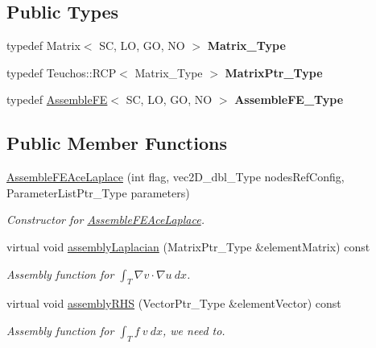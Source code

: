 \subsection*{Public Types}
\begin{DoxyCompactItemize}
\item 
\mbox{\label{classFEDD_1_1AssembleFEAceLaplace_ad5a1d233cdc46488449047924e868010}} 
typedef Matrix$<$ SC, LO, GO, NO $>$ {\bfseries Matrix\+\_\+\+Type}
\item 
\mbox{\label{classFEDD_1_1AssembleFEAceLaplace_aef601b47321c72006e231340b6b79f01}} 
typedef Teuchos\+::\+R\+CP$<$ Matrix\+\_\+\+Type $>$ {\bfseries Matrix\+Ptr\+\_\+\+Type}
\item 
\mbox{\label{classFEDD_1_1AssembleFEAceLaplace_aa8feabd583240a7d1dc1f826ac01bdff}} 
typedef \hyperlink{classFEDD_1_1AssembleFE}{Assemble\+FE}$<$ SC, LO, GO, NO $>$ {\bfseries Assemble\+F\+E\+\_\+\+Type}
\end{DoxyCompactItemize}
\subsection*{Public Member Functions}
\begin{DoxyCompactItemize}
\item 
\hyperlink{classFEDD_1_1AssembleFEAceLaplace_a3e81060bb08ca1a1b9764e432eeed762}{Assemble\+F\+E\+Ace\+Laplace} (int flag, vec2\+D\+\_\+dbl\+\_\+\+Type nodes\+Ref\+Config, Parameter\+List\+Ptr\+\_\+\+Type parameters)
\begin{DoxyCompactList}\small\item\em Constructor for \hyperlink{classFEDD_1_1AssembleFEAceLaplace}{Assemble\+F\+E\+Ace\+Laplace}. \end{DoxyCompactList}\item 
virtual void \hyperlink{classFEDD_1_1AssembleFEAceLaplace_ab59722275fe6be6cdd4a1af48bd5a948}{assembly\+Laplacian} (Matrix\+Ptr\+\_\+\+Type \&element\+Matrix) const
\begin{DoxyCompactList}\small\item\em Assembly function for $ \int_T \nabla v \cdot \nabla u ~dx$. \end{DoxyCompactList}\item 
virtual void \hyperlink{classFEDD_1_1AssembleFEAceLaplace_af3ab42337c36c45446ecfa19bbb51134}{assembly\+R\+HS} (Vector\+Ptr\+\_\+\+Type \&element\+Vector) const
\begin{DoxyCompactList}\small\item\em Assembly function for $ \int_T f ~ v ~dx $, we need to. \end{DoxyCompactList}\end{DoxyCompactItemize}


